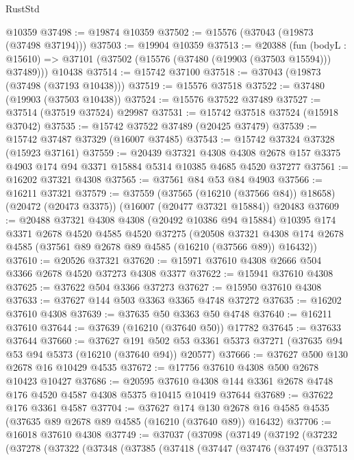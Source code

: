 \begin{lexlean}{RustStd}
\begin{coremodule}
    @10359
@37498 := @19874 @10359
@37502 := @15576 (@37043 (@19873 (@37498 @37194)))
@37503 := @19904 @10359
@37513 := @20388
    (fun (bodyL : @15610) => @37101 (@37502 (@15576 (@37480 (@19903 (@37503 @15594))) @37489)))
    @10438
@37514 := @15742 @37100
@37518 := @37043 (@19873 (@37498 (@37193 @10438)))
@37519 := @15576 @37518
@37522 := @37480 (@19903 (@37503 @10438))
@37524 := @15576 @37522 @37489
@37527 := @37514 (@37519 @37524) @29987
@37531 := @15742 @37518 @37524 (@15918 @37042)
@37535 := @15742 @37522 @37489 (@20425 @37479)
@37539 := @15742 @37487 @37329 (@16007 @37485)
@37543 := @15742 @37324 @37328 (@15923 @37161)
@37559 := @20439
    @37321
    @4308
    @4308
    @2678
    @157
    @3375
    @4903
    @174
    @94
    @3371
    @15884
    @5314
    @10385
    @4685
    @4520
    @37277
@37561 := @16202 @37321 @4308
@37565 := @37561 @84 @53 @84 @4903
@37566 := @16211 @37321
@37579 := @37559
    (@37565 (@16210 (@37566 @84)) @18658)
    (@20472 (@20473 @3375))
    (@16007 (@20477 @37321 @15884))
    @20483
@37609 := @20488
    @37321
    @4308
    @4308
    (@20492 @10386 @94 @15884)
    @10395
    @174
    @3371
    @2678
    @4520
    @4585
    @4520
    @37275
    (@20508 @37321 @4308 @174 @2678 @4585 (@37561 @89 @2678 @89 @4585 (@16210 (@37566 @89)) @16432))
@37610 := @20526 @37321
@37620 := @15971 @37610 @4308 @2666 @504 @3366 @2678 @4520 @37273 @4308 @3377
@37622 := @15941 @37610 @4308
@37625 := @37622 @504 @3366 @37273
@37627 := @15950 @37610 @4308
@37633 := @37627 @144 @503 @3363 @3365 @4748 @37272
@37635 := @16202 @37610 @4308
@37639 := @37635 @50 @3363 @50 @4748
@37640 := @16211 @37610
@37644 := @37639 (@16210 (@37640 @50)) @17782
@37645 := @37633 @37644
@37660 := @37627
    @191
    @502
    @53
    @3361
    @5373
    @37271
    (@37635 @94 @53 @94 @5373 (@16210 (@37640 @94)) @20577)
@37666 := @37627 @500 @130 @2678 @16 @10429 @4535
@37672 := @17756 @37610 @4308 @500 @2678 @10423 @10427
@37686 := @20595
    @37610
    @4308
    @144
    @3361
    @2678
    @4748
    @176
    @4520
    @4587
    @4308
    @5375
    @10415
    @10419
    @37644
@37689 := @37622 @176 @3361 @4587
@37704 := @37627
    @174
    @130
    @2678
    @16
    @4585
    @4535
    (@37635 @89 @2678 @89 @4585 (@16210 (@37640 @89)) @16432)
@37706 := @16018 @37610 @4308
@37749 := @37037
    (@37098
      (@37149
        (@37192
          (@37232
            (@37278
              (@37322
                (@37348
                  (@37385
                    (@37418
                      (@37447
                        (@37476
                          (@37497
                            (@37513

\end{coremodule}
\end{lexlean}
